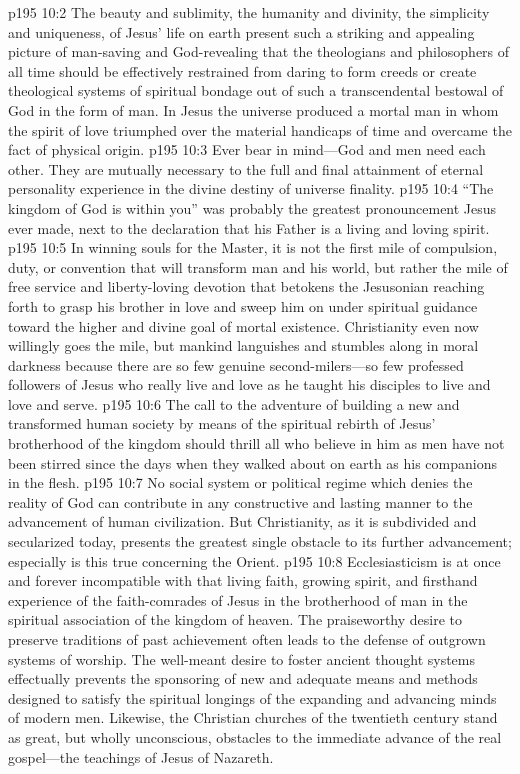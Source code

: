 \vs p195 10:2 The beauty and sublimity, the humanity and divinity, the simplicity and uniqueness, of Jesus’ life on earth present such a striking and appealing picture of man\hyp{}saving and God\hyp{}revealing that the theologians and philosophers of all time should be effectively restrained from daring to form creeds or create theological systems of spiritual bondage out of such a transcendental bestowal of God in the form of man. In Jesus the universe produced a mortal man in whom the spirit of love triumphed over the material handicaps of time and overcame the fact of physical origin.
\pc \vs p195 10:3 Ever bear in mind---God and men need each other. They are mutually necessary to the full and final attainment of eternal personality experience in the divine destiny of universe finality.
\vs p195 10:4 \textcolor{ubdarkred}{“The kingdom of God is within you”} was probably the greatest pronouncement Jesus ever made, next to the declaration that his Father is a living and loving spirit.
\pc \vs p195 10:5 In winning souls for the Master, it is not the first mile of compulsion, duty, or convention that will transform man and his world, but rather the  mile of free service and liberty\hyp{}loving devotion that betokens the Jesusonian reaching forth to grasp his brother in love and sweep him on under spiritual guidance toward the higher and divine goal of mortal existence. Christianity even now willingly goes the  mile, but mankind languishes and stumbles along in moral darkness because there are so few genuine second\hyp{}milers---so few professed followers of Jesus who really live and love as he taught his disciples to live and love and serve.
\vs p195 10:6 The call to the adventure of building a new and transformed human society by means of the spiritual rebirth of Jesus’ brotherhood of the kingdom should thrill all who believe in him as men have not been stirred since the days when they walked about on earth as his companions in the flesh.
\vs p195 10:7 No social system or political regime which denies the reality of God can contribute in any constructive and lasting manner to the advancement of human civilization. But Christianity, as it is subdivided and secularized today, presents the greatest single obstacle to its further advancement; especially is this true concerning the Orient.
\pc \vs p195 10:8 Ecclesiasticism is at once and forever incompatible with that living faith, growing spirit, and firsthand experience of the faith\hyp{}comrades of Jesus in the brotherhood of man in the spiritual association of the kingdom of heaven. The praiseworthy desire to preserve traditions of past achievement often leads to the defense of outgrown systems of worship. The well\hyp{}meant desire to foster ancient thought systems effectually prevents the sponsoring of new and adequate means and methods designed to satisfy the spiritual longings of the expanding and advancing minds of modern men. Likewise, the Christian churches of the twentieth century stand as great, but wholly unconscious, obstacles to the immediate advance of the real gospel---the teachings of Jesus of Nazareth.
